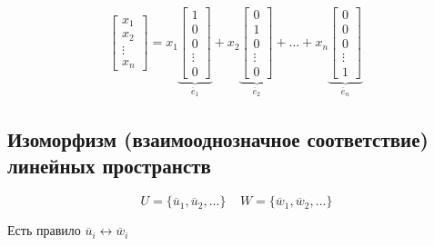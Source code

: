 \documentclass{article}
\begin{document}
\begin{gather*}
    \begin{bmatrix}
        x_1    \\
        x_2    \\
        \vdots \\
        x_n
    \end{bmatrix} = x_1 \underbrace{\begin{bmatrix}
        1      \\
        0      \\
        0      \\
        \vdots \\
        0
    \end{bmatrix}}_{\overline{e}_1} + x_2 \underbrace{\begin{bmatrix}
        0      \\
        1      \\
        0      \\
        \vdots \\
        0
    \end{bmatrix}}_{\overline{e}_2} + \dots + x_n \underbrace{\begin{bmatrix}
        0      \\
        0      \\
        0      \\
        \vdots \\
        1
    \end{bmatrix}}_{\overline{e}_n} \underset{\underset{\underset{\underset{\underset{\underset{\underset{\underset{\underset{\underset{\underset{\underset{\text{--- стандартный базис в } \mathbb{R}^n}{~}}{~}}{~}}{~}}{~}}{~}}{~}}{~}}{~}}{~}}{~}}{~}
\end{gather*}


\subsection{Изоморфизм (взаимооднозначное соответствие) линейных пространств}
\[
    U = \{\overline{u}_1, \overline{u}_2, \dots\} ~~~~~
    W = \{\overline{w}_1, \overline{w}_2, \dots\}
\]

Есть правило $\overline{u}_i \leftrightarrow \overline{w}_i$
\end{document}
